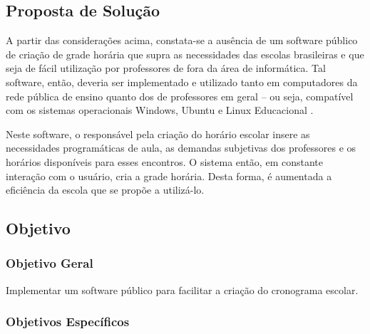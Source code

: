 \documentclass[12pt,a4paper]{article}
\begin{document}
		\subsection{Proposta de Solução}

			 \par A partir das considerações acima, constata-se a ausência de um software público \cite{publico} de criação de grade horária que supra as necessidades das escolas brasileiras e que seja de fácil utilização por professores de fora da área de informática. Tal software, então, deveria ser implementado e utilizado tanto em computadores da rede pública de ensino quanto dos de professores em geral -- ou seja, compatível com os sistemas operacionais Windows, Ubuntu e Linux Educacional \cite{proinfo,w3s}.

			 \par Neste software, o responsável pela criação do horário escolar insere as necessidades programáticas de aula, as demandas subjetivas dos professores e os horários disponíveis para esses encontros. O sistema então, em constante interação com o usuário, cria a grade horária. Desta forma, é aumentada a eficiência da escola que se propõe a utilizá-lo.

		\subsection{Objetivo}

			\subsubsection{Objetivo Geral}

				\par Implementar um software público para facilitar a criação do cronograma escolar.

			\subsubsection{Objetivos Específicos}
\end{document}
